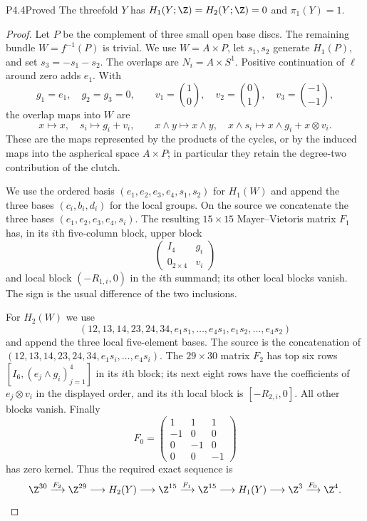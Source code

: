 \begin{statement}{P4.4}{Proved}
The threefold $Y$ has $H_1(Y;\Z)=H_2(Y;\Z)=0$ and $\pi_1(Y)=1$.
\end{statement}
\begin{proof}
Let $P$ be the complement of three small open base discs. The remaining
bundle $W=f^{-1}(P)$ is trivial. We use $W=A\times P$, let $s_1,s_2$
generate $H_1(P)$, and set $s_3=-s_1-s_2$. The overlaps are
$N_i=A\times S^1$. Positive continuation of $\ell$ around zero adds $e_1$.
With
\[
 g_1=e_1,\quad g_2=g_3=0,\qquad
 v_1=\binom10,\quad v_2=\binom01,\quad v_3=\binom{-1}{-1},
\]
the overlap maps into $W$ are
\[
 x\mapsto x,\quad s_i\mapsto g_i+v_i,\qquad
 x\wedge y\mapsto x\wedge y,\quad
 x\wedge s_i\mapsto x\wedge g_i+x\otimes v_i.
\]
These are the maps represented by the products of the cycles, or by the
induced maps into the aspherical space $A\times P$; in particular they
retain the degree-two contribution of the clutch.

We use the ordered basis $(e_1,e_2,e_3,e_4,s_1,s_2)$ for $H_1(W)$ and
append the three bases $(c_i,b_i,d_i)$ for the local groups. On the source
we concatenate the three bases $(e_1,e_2,e_3,e_4,s_i)$. The resulting
$15\times15$ Mayer--Vietoris matrix $F_1$ has, in its $i$th five-column
block, upper block
\[
 \begin{pmatrix}I_4&g_i\\0_{2\times4}&v_i\end{pmatrix}
\]
and local block $(-R_{1,i},0)$ in the $i$th summand; its other local
blocks vanish. The sign is the usual difference of the two inclusions.

For $H_2(W)$ we use
\[
 (12,13,14,23,24,34,e_1s_1,\ldots,e_4s_1,e_1s_2,\ldots,e_4s_2)
\]
and append the three local five-element bases. The source is the
concatenation of $(12,13,14,23,24,34,e_1s_i,\ldots,e_4s_i)$.
The $29\times30$ matrix $F_2$ has top six rows
$[I_6,(e_j\wedge g_i)_{j=1}^4]$ in its $i$th block; its next eight rows
have the coefficients of $e_j\otimes v_i$ in the displayed order, and
its $i$th local block is $[-R_{2,i},0]$. All other blocks vanish.
Finally
\[
 F_0=\begin{pmatrix}1&1&1\\-1&0&0\\0&-1&0\\0&0&-1\end{pmatrix}
\]
has zero kernel. Thus the required exact sequence is
\[
 \Z^{30}\xrightarrow{F_2}\Z^{29}\longrightarrow H_2(Y)
 \longrightarrow\Z^{15}\xrightarrow{F_1}\Z^{15}\longrightarrow H_1(Y)
 \longrightarrow\Z^3\xrightarrow{F_0}\Z^4.
\]


\end{proof}
